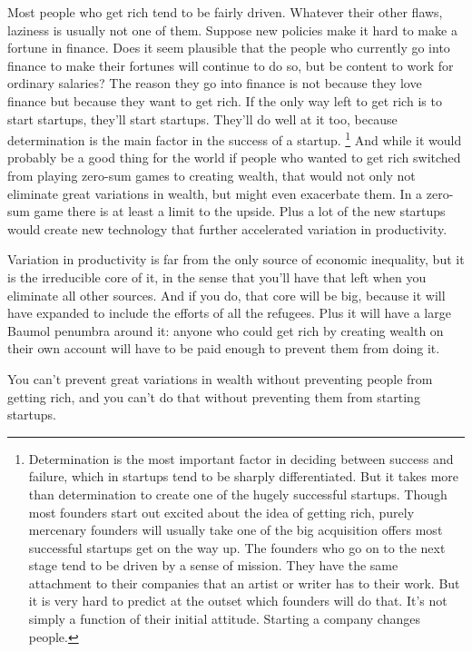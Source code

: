 Most people who get rich tend to be fairly driven. Whatever their other
flaws, laziness is usually not one of them. Suppose new policies make it
hard to make a fortune in finance. Does it seem plausible that the
people who currently go into finance to make their fortunes will
continue to do so, but be content to work for ordinary salaries? The
reason they go into finance is not because they love finance but because
they want to get rich. If the only way left to get rich is to start
startups, they'll start startups. They'll do well at it too, because
determination is the main factor in the success of a startup.
\footnote{Determination is the most important factor in deciding between
success and failure, which in startups tend to be sharply
differentiated. But it takes more than determination to create one of
the hugely successful startups. Though most founders start out excited
about the idea of getting rich, purely mercenary founders will usually
take one of the big acquisition offers most successful startups get on
the way up. The founders who go on to the next stage tend to be driven
by a sense of mission. They have the same attachment to their companies
that an artist or writer has to their work. But it is very hard to
predict at the outset which founders will do that. It's not simply a
function of their initial attitude. Starting a company changes people.} And while it would probably be a good thing for
the world if people who wanted to get rich switched from playing
zero-sum games to creating wealth, that would not only not eliminate
great variations in wealth, but might even exacerbate them. In a
zero-sum game there is at least a limit to the upside. Plus a lot of the
new startups would create new technology that further accelerated
variation in productivity.

Variation in productivity is far from the only source of economic
inequality, but it is the irreducible core of it, in the sense that
you'll have that left when you eliminate all other sources. And if you
do, that core will be big, because it will have expanded to include the
efforts of all the refugees. Plus it will have a large Baumol penumbra
around it: anyone who could get rich by creating wealth on their own
account will have to be paid enough to prevent them from doing it.

You can't prevent great variations in wealth without preventing people
from getting rich, and you can't do that without preventing them from
starting startups.

